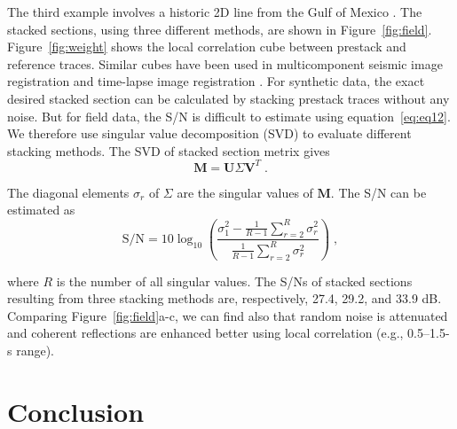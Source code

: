 The third example involves a historic 2D line
from the Gulf of Mexico \cite[]{Claerbout05}. The
stacked sections, using three different methods,
are shown in Figure~\ref{fig:field}. Figure~\ref{fig:weight} shows the local
correlation cube between prestack and reference
traces. Similar cubes have been used in multicomponent
seismic image registration \cite[]{Fomel05,Fomel07b} and time-lapse image
registration \cite[]{Fomel07}. For synthetic
data, the exact desired stacked section can be calculated
by stacking prestack traces without any
noise. But for field data, the S/N is difficult to estimate
using equation~\ref{eq:eq12}. We therefore use singular
value decomposition (SVD) \cite{Andrews76} to evaluate different stacking
methods. The SVD of stacked section metrix gives
      \begin{equation}
          \mathbf{M} = \mathbf{U} \Sigma \mathbf{V}^T\;.
        \label{eq:eq13}
      \end{equation}

The diagonal elements $\sigma_r$ of $\Sigma$ are the singular values of 
$\mathbf{M}$. The S/N can be estimated as \cite[]{Freire88,Peterson88,Grion98}
      \begin{equation}
          \textrm{S/N} = 10 \log_{10} \left(\frac{\sigma^2_1 - \frac{1}{R-1} \displaystyle\sum_{r=2}^{R}\sigma^2_r}{\frac{1}{R-1}\displaystyle\sum_{r=2}^{R}\sigma^2_r} \right) \;,
        \label{eq:eq14}
      \end{equation}

where $R$ is the number of all singular values. The S/Ns of stacked
sections resulting from three stacking methods are, respectively,
27.4, 29.2, and 33.9 dB. Comparing Figure~\ref{fig:field}a-c, we can find also
that random noise is attenuated and coherent reflections are enhanced
better using local correlation (e.g., 0.5--1.5-s range).

 \section{Conclusion}

